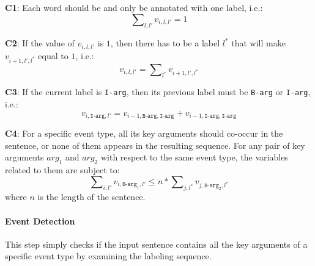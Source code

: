 \textbf{C1}: Each word should be and only be annotated with one label, i.e.:
\begin{equation}
	\sum\nolimits_{l,l'}v_{i,l,l'}=1
\end{equation}

\textbf{C2}: If the value of $v_{i,l,l'}$ is $1$, then there has to be a label $l^*$ that will make $v_{i+1,l',l^*}$ equal to $1$, i.e.:
\begin{equation}
	v_{i,l,l'} = \sum\nolimits_{l^*}v_{i+1,l',l^*}
\end{equation}

\textbf{C3}: If the current label is \texttt{I-arg}, then its previous label must be \texttt{B-arg} or \texttt{I-arg}, i.e.:
\begin{equation}
	v_{i,\texttt{I-arg},l'} = v_{i-1,\texttt{B-arg},\texttt{I-arg}} + v_{i-1, \texttt{I-arg}, \texttt{I-arg}}
\end{equation}

\textbf{C4}: For a specific event type, all its key arguments should co-occur in the sentence, or none of them appears in the resulting sequence. For any pair of key arguments $arg_1$ and $arg_2$ with respect to the same event type, the variables related to them are subject to:
\begin{equation}
	\sum\nolimits_{i,l'}{v_{i,\texttt{B-arg}_1,l'}} \leq n * \sum\nolimits_{j,l^*}{v_{j,\texttt{B-arg}_2,l^*}}
\end{equation}
where $n$ is the length of the sentence.

\paragraph{Event Detection}
This step simply checks if the input sentence contains all the key arguments of a specific event type by
examining the labeling sequence. %


